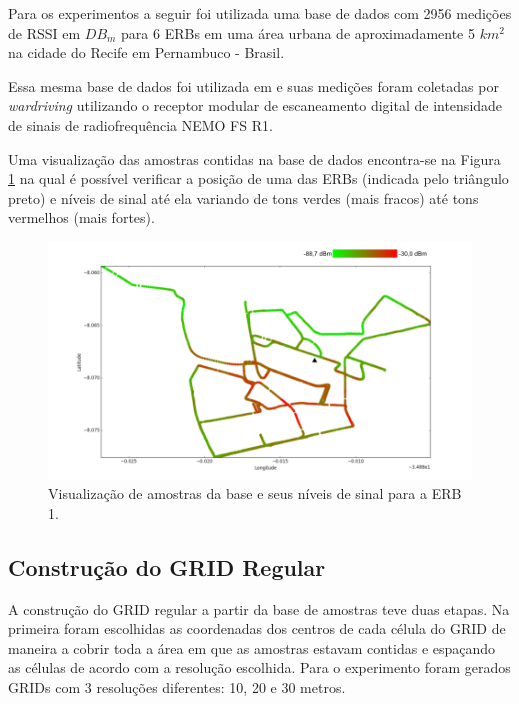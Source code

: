 \documentclass[12pt]{article}
\begin{document}
        Para os experimentos a seguir foi utilizada uma base de dados com 2956 medições de RSSI em $DB_m$ para 6 ERBs em uma área urbana de aproximadamente 5 $km^2$ na cidade do Recife em Pernambuco - Brasil. 
        
        Essa mesma base de dados foi utilizada em \cite{teseRobson2014} e suas medições foram coletadas por \textit{wardriving} utilizando o receptor modular de escaneamento digital de intensidade de sinais de radiofrequência NEMO FS R1.
        
        Uma visualização das amostras contidas na base de dados encontra-se na Figura \ref{fig:visualizacaoAmostras} na qual é possível verificar a posição de uma das ERBs (indicada pelo triângulo preto) e níveis de sinal até ela variando de tons verdes (mais fracos) até tons vermelhos (mais fortes).
        
        \begin{figure}[H]
        \centering
        \includegraphics[width=16cm]{images/visualizacaoAmostras.png}\par
        \caption{Visualização de amostras da base e seus níveis de sinal para a ERB 1.}
        \label{fig:visualizacaoAmostras}
        \end{figure}
    
        \subsection{Construção do GRID Regular}
        \label{sec:experimentoGrid}
        
        A construção do GRID regular a partir da base de amostras teve duas etapas. Na primeira foram escolhidas as coordenadas dos centros de cada célula do GRID de maneira a cobrir toda a área em que as amostras estavam contidas e espaçando as células de acordo com a resolução escolhida. Para o experimento foram gerados GRIDs com 3 resoluções diferentes: 10, 20 e 30 metros.
        
\end{document}
